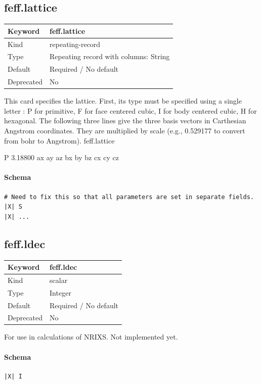 \documentclass[11pt]{article}
\begin{document}
{{{\subsection{feff.lattice}
\label{kw:feff-lattice}
\begin{longtable}{|p{1.5in}|p{4.5in}|}
\hline
Keyword & feff.lattice \\
\hline
Kind & repeating-record \\
\hline
Type & Repeating record with columns: String \\
\hline
Default & Required / No default \\
\hline
Deprecated & No \\
\hline
\end{longtable}
 This card specifies the lattice. First, its type must be specified using a single letter : P for
 primitive, F for face centered cubic, I for body centered cubic, H for hexagonal. The following
 three lines give the three basis vectors in Carthesian Angstrom coordinates. They are multiplied
 by scale (e.g., 0.529177 to convert from bohr to Angstrom).
 feff.lattice{ P 3.18800
 ax ay az
 bx by bz
 cx cy cz

\paragraph{Schema}
\begin{Verbatim}
# Need to fix this so that all parameters are set in separate fields.
|X| S
|X| ...
\end{Verbatim}

\subsection{feff.ldec}
\label{kw:feff-ldec}
\begin{longtable}{|p{1.5in}|p{4.5in}|}
\hline
Keyword & feff.ldec \\
\hline
Kind & scalar \\
\hline
Type & Integer \\
\hline
Default & Required / No default \\
\hline
Deprecated & No \\
\hline
\end{longtable}
 For use in calculations of NRIXS. Not implemented yet.

\paragraph{Schema}
\begin{Verbatim}
|X| I
\end{Verbatim}

}}}}
\end{document}

